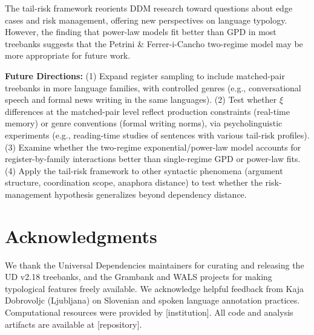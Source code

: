 \documentclass[11pt,letterpaper]{article}
\begin{document}
The tail-risk framework reorients DDM research toward questions about edge cases and risk management, offering new perspectives on language typology. However, the finding that power-law models fit better than GPD in most treebanks suggests that the Petrini \& Ferrer-i-Cancho two-regime model may be more appropriate for future work.

\textbf{Future Directions:} (1) Expand register sampling to include matched-pair treebanks in more language families, with controlled genres (e.g., conversational speech and formal news writing in the same languages). (2) Test whether $\xi$ differences at the matched-pair level reflect production constraints (real-time memory) or genre conventions (formal writing norms), via psycholinguistic experiments (e.g., reading-time studies of sentences with various tail-risk profiles). (3) Examine whether the two-regime exponential/power-law model accounts for register-by-family interactions better than single-regime GPD or power-law fits. (4) Apply the tail-risk framework to other syntactic phenomena (argument structure, coordination scope, anaphora distance) to test whether the risk-management hypothesis generalizes beyond dependency distance.

\section*{Acknowledgments}

We thank the Universal Dependencies maintainers for curating and releasing the UD v2.18 treebanks, and the Grambank and WALS projects for making typological features freely available. We acknowledge helpful feedback from Kaja Dobrovoljc (Ljubljana) on Slovenian and spoken language annotation practices. Computational resources were provided by [institution]. All code and analysis artifacts are available at [repository].



\end{document}
